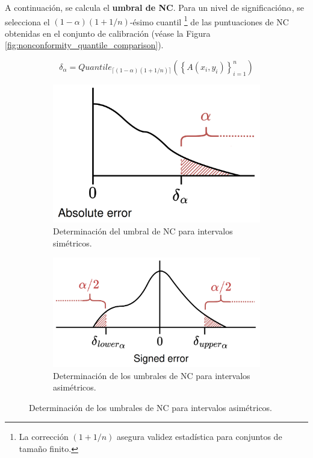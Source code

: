 \begin{enumerate}
    A continuación, se calcula el \textbf{umbral de \acrshort{NC}}. Para un nivel de significación$\alpha$, se selecciona el $(1 - \alpha)(1 + 1/n)$-ésimo cuantil%
    \footnote{
        La corrección $(1 + 1/n)$ asegura validez estadística para conjuntos de tamaño finito.
    } 
    de las puntuaciones de \acrshort{NC} obtenidas en el conjunto de calibración (véase la Figura \ref{fig:nonconformity_quantile_comparison}).

    $$
    \delta_\alpha = Quantile_{ \lceil  (1-\alpha) (1 + 1/n)  \rceil } ( \left\{ A(x_i,y_i) \right\}_{i=1}^n )
    $$

    \begin{figure}[htbp]
        \centering

        \begin{subfigure}[b]{0.48\textwidth}
            \centering
            \includegraphics[width=\textwidth]{capitulos/cap_02/imagenes/nonconformity_quantile_threshold_simetric.png}
            \caption{Determinación del umbral de NC para intervalos simétricos.}
            \label{fig:nonconformity_quantile_threshold_simetric}
        \end{subfigure}
        \hfill
        \begin{subfigure}[b]{0.49\textwidth}
            \centering
            \includegraphics[width=\textwidth]{capitulos/cap_02/imagenes/nonconformity_quantile_threshold_asimetric.png}
            \caption{Determinación de los umbrales de NC para intervalos asimétricos.}
            \label{fig:nonconformity_quantile_threshold_asimetric}
        \end{subfigure}


\end{figure}
\end{enumerate}
